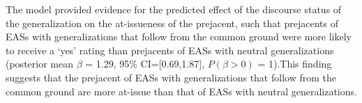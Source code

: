 \documentclass[11pt,fleqn]{article}
\newcommand{\6}{\mbox{$[\hspace*{-.6mm}[$}}
\newcommand{\9}{\mbox{$]\hspace*{-.6mm}]$}}
\begin{document}
The model provided evidence for the predicted effect of the discourse status of the generalization on the at-issueness of the prejacent, such that  prejacents of EASs with generalizations that follow from the common ground were more likely to receive a `yes' rating than prejacents of EASs with neutral generalizations  (posterior mean $\beta$ = 1.29, 95\% CI={[}0.69,1.87{]}, $P(\beta > 0)$ = 1).This finding suggests that the prejacent of EASs with generalizations that follow from the common ground are more at-issue than that of EASs with neutral generalizations. 
\end{document}
